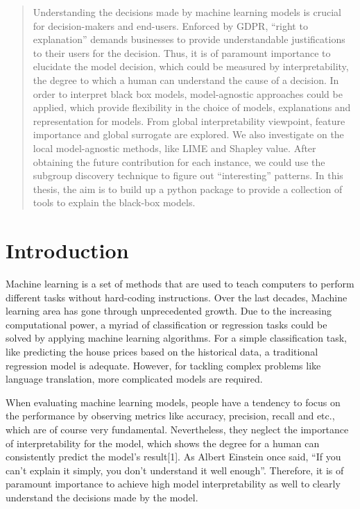 \documentclass{CSSHThesis}
\begin{document}
\def \TypeofThesis{Master Thesis Proposal}
\def \TitleofThesis{Something interesting and meaningful}
\def \AuthorofThesis{Xiaoqi Ma}
\def \FirstSupervisor{Dr. Florian Lemmerich}
\def \SecondSupervisor{Prof. Dr. Markus Strohmaier}
\def \Advisor{Dr. Florian Lemmerich}

\begin{abstract}
	Understanding the decisions made by machine learning models is crucial for decision-makers and end-users. Enforced by GDPR, “right to explanation” demands businesses to provide understandable justifications to their users for the decision. Thus, it is of paramount importance to elucidate the model decision, which could be measured by interpretability, the degree to which a human can understand the cause of a decision. In order to interpret black box models, model-agnostic approaches could be applied, which provide flexibility in the choice of models, explanations and representation for models. From global interpretability viewpoint, feature importance and global surrogate are explored. We also investigate on the local model-agnostic methods, like LIME and Shapley value. After obtaining the future contribution for each instance, we could use the subgroup discovery technique to figure out “interesting” patterns. In this thesis, the aim is to build up a python package to provide a collection of tools to explain the black-box models.
\end{abstract}
\cleardoublepage
{} %
\section{Introduction}
\thispagestyle{empty}
Machine learning is a set of methods that are used to teach computers to perform different tasks without hard-coding instructions. Over the last decades, Machine learning area has gone through unprecedented growth. Due to the increasing computational power, a myriad of classification or regression tasks could be solved by applying machine learning algorithms. For a simple classification task, like predicting the house prices based on the historical data, a traditional regression model is adequate. However, for tackling complex problems like language translation, more complicated models are required. 

When evaluating machine learning models, people have a tendency to focus on the performance by observing metrics like accuracy, precision, recall and etc., which are of course very fundamental. Nevertheless, they neglect the importance of interpretability for the model, which shows the degree for a human can consistently predict the model’s result[1]. As Albert Einstein once said, “If you can’t explain it simply, you don’t understand it well enough”. Therefore, it is of paramount importance to achieve high model interpretability as well to clearly understand the decisions made by the model. 
\end{document}
